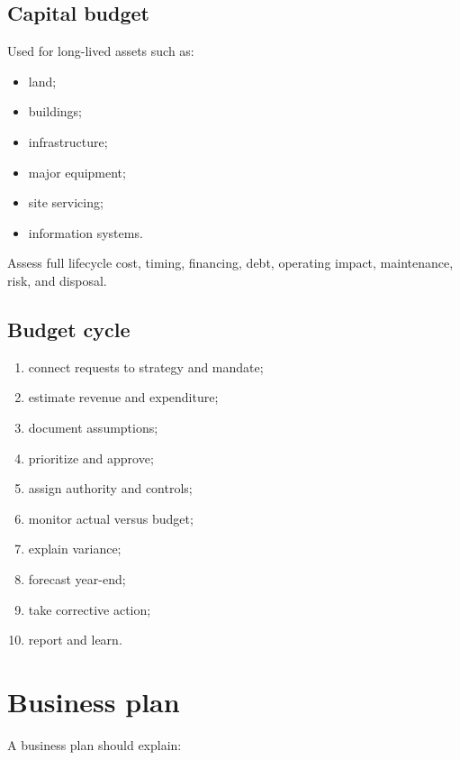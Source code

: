 \documentclass[11pt,letterpaper,oneside,openany]{book}
\begin{document}
\subsection[Capital budget]{Capital budget}
Used for long-lived assets such as:


\begin{itemize}
\item land;
\item buildings;
\item infrastructure;
\item major equipment;
\item site servicing;
\item information systems.
\end{itemize}


Assess full lifecycle cost, timing, financing, debt, operating impact, maintenance, risk, and disposal.


\subsection[Budget cycle]{Budget cycle}
\begin{enumerate}
\item connect requests to strategy and mandate;
\item estimate revenue and expenditure;
\item document assumptions;
\item prioritize and approve;
\item assign authority and controls;
\item monitor actual versus budget;
\item explain variance;
\item forecast year-end;
\item take corrective action;
\item report and learn.
\end{enumerate}


\section[Business plan]{Business plan}
A business plan should explain:
\end{document}
